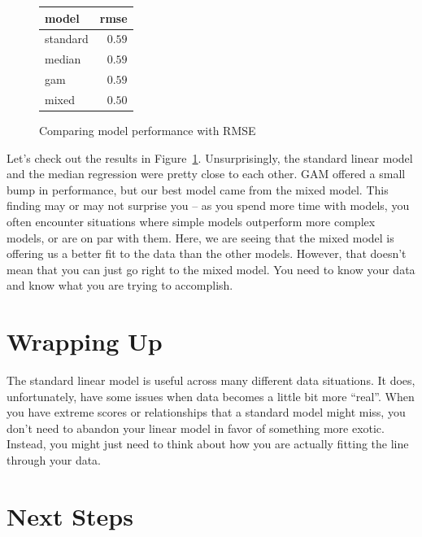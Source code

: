 \documentclass[
  letterpaper,
]{krantz}
\begin{document}
\begin{figure}

{\centering 

\hypertarget{fig-model_performance_comp-1}{}
\begin{longtable*}{lr}
\toprule
model & rmse \\ 
\midrule\addlinespace[2.5pt]
standard & \textcolor[HTML]{404040}{$0.59$} \\ 
median & \textcolor[HTML]{404040}{$0.59$} \\ 
gam & \textcolor[HTML]{404040}{$0.59$} \\ 
mixed & \textcolor[HTML]{404040}{$0.50$} \\ 
\bottomrule
\end{longtable*}

}

\caption{\label{fig-model_performance_comp}Comparing model performance
with RMSE}

\end{figure}

Let's check out the results in Figure~\ref{fig-model_performance_comp}.
Unsurprisingly, the standard linear model and the median regression were
pretty close to each other. GAM offered a small bump in performance, but
our best model came from the mixed model. This finding may or may not
surprise you -- as you spend more time with models, you often encounter
situations where simple models outperform more complex models, or are on
par with them. Here, we are seeing that the mixed model is offering us a
better fit to the data than the other models. However, that doesn't mean
that you can just go right to the mixed model. You need to know your
data and know what you are trying to accomplish.

\section{Wrapping Up}\label{sec-lm-extend-wrap}

The standard linear model is useful across many different data
situations. It does, unfortunately, have some issues when data becomes a
little bit more ``real''. When you have extreme scores or relationships
that a standard model might miss, you don't need to abandon your linear
model in favor of something more exotic. Instead, you might just need to
think about how you are actually fitting the line through your data.

\section{Next Steps}\label{sec-lm-extend-next-steps}
\end{document}
